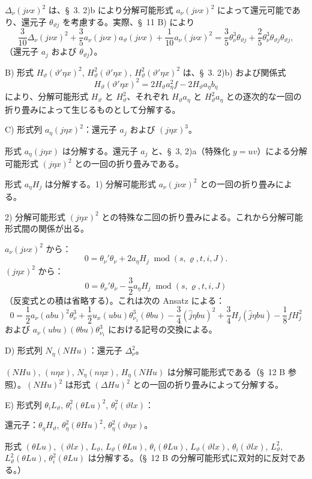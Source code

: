 \documentclass[11pt]{article}
\newcommand{\A}{\Delta}
\newcommand{\R}{\varrho}
\newcommand{\modu}[1]{\;\operatorname{mod} #1}
\begin{document}
$\A_\nu(j\nu x)^2$ は、\S\ 3. 2)b により分解可能形式 $a_\nu(j\nu x)^2$ によって還元可能であり、還元子 $\theta_{\vartheta j}$ を考慮する。実際、\S\ 11 B) により
\[
\frac3{10}\A_\nu(j\nu x)^2+\frac35a_\nu(j\nu x)a_\vartheta(j\nu x)
+\frac1{10}a_\nu(j\nu x)^2
=\frac35\theta_\nu^3\theta_{\vartheta j}+\frac25\theta_\nu^3\theta_{\vartheta j}\theta_{\vartheta j},
\]
（還元子 $a_j$ および $\theta_{\vartheta j}$）。

\noindent B) 形式 $H_\vartheta(\vartheta'\eta x)^2$, $H_\vartheta^2(\vartheta'\eta x)$, $H_\vartheta^2(\vartheta'\eta x)^2$ は、\S\ 3. 2)b) および関係式
\[
H_\vartheta(\vartheta'\eta x)^2=2H_\vartheta a_\eta^2f-2H_\vartheta a_\eta b_\eta
\]
により、分解可能形式 $H_\vartheta$ と $H_\vartheta^2$、それぞれ $H_\vartheta a_\eta$ と $H_\vartheta^2a_\eta$ との逐次的な一回の折り畳みによって生じるものとして分解する。

\noindent C) 形式列 $a_\eta(j\eta x)^2$：還元子 $a_j$ および $(j\eta x)^3$。

形式 $a_\eta(j\eta x)$ は分解する。還元子 $a_j$ と、\S\ 3, 2)a（特殊化 $y=uv$）による分解可能形式 $(j\eta x)^2$ との一回の折り畳みである。

形式 $a_\eta H_j$ は分解する。1) 分解可能形式 $a_\nu(j\nu x)^2$ との一回の折り畳みによる。

2) 分解可能形式 $(j\eta x)^2$ との特殊な二回の折り畳みによる。これから分解可能形式間の関係が出る。

$a_\nu(j\nu x)^2$ から：
\[
0=\theta_\nu'\theta_\nu+2a_\eta H_j\modu{(s,\R,t,i,J)}.
\]
$(j\eta x)^2$ から：
\[
0=\theta_\nu'\theta_\nu-\frac32a_\eta H_j\modu{(s,\R,t,i,J)}
\]
（反変式との積は省略する）。これは次の Ansatz による：
\[
0=\frac12a_\nu(abu)^2\theta_\nu^3
+\frac12u_x(ubu)\theta_{\nu_1}^3(\theta bu)
-\frac34(\widehat{j}\eta bu)^2+\frac34H_j(\widehat{j}\eta bu)
-\frac18fH_j^2
\]
および $a_\nu(ubu)(\theta bu)\theta_{\nu_1}^3$ における記号の交換による。

\noindent D) 形式列 $N_\eta(NHu)$：還元子 $\A_\nu^2$。

$(NHu)$, $(n\eta x)$, $N_\eta(n\eta x)$, $H_\eta(NHu)$ は分解可能形式である（\S\ 12 B 参照）。$(NHu)^2$ は形式 $(\A Hu)^2$ との一回の折り畳みによって分解する。

\noindent E) 形式列 $\theta_iL_\vartheta$, $\theta_i^2(\theta Lu)^2$, $\theta_i^2(\vartheta lx)$：

還元子：$\theta_\eta H_\vartheta$, $\theta_\eta^2(\theta Hu)^2$, $\theta_\eta^2(\vartheta\eta x)$。

形式 $(\theta Lu)$, $(\vartheta lx)$, $L_\vartheta$, $L_\vartheta(\theta Lu)$, $\theta_i(\theta Lu)$, $L_\vartheta(\vartheta lx)$, $\theta_i(\vartheta lx)$, $L_\vartheta^2$, $L_\vartheta^2(\theta Lu)$, $\theta_i^2(\theta Lu)$ は分解する。（\S\ 12 B の分解可能形式に双対的に反対である。）
\end{document}
